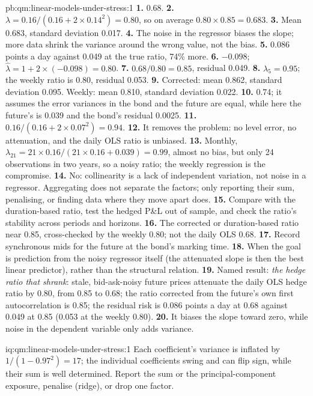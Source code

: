 \begin{solution}{pb:qm:linear-models-under-stress:1}
\textbf{1.} 0.68.
\textbf{2.} $\lambda = 0.16/(0.16 + 2 \times 0.14^2) = 0.80$, so on average $0.80 \times 0.85 = 0.683$.
\textbf{3.} Mean 0.683, standard deviation 0.017.
\textbf{4.} The noise in the regressor biases the slope; more data shrink the variance around the wrong value, not the bias.
\textbf{5.} 0.086 points a day against 0.049 at the true ratio, 74\% more.
\textbf{6.} $-0.098$; $\hat\lambda = 1 + 2 \times (-0.098) = 0.80$.
\textbf{7.} $0.68/0.80 = 0.85$, residual 0.049.
\textbf{8.} $\lambda_5 = 0.95$; the weekly ratio is 0.80, residual 0.053.
\textbf{9.} Corrected: mean 0.862, standard deviation 0.095. Weekly: mean 0.810, standard deviation 0.022.
\textbf{10.} 0.74; it assumes the error variances in the bond and the future are equal, while here the future's is 0.039 and the bond's residual
0.0025.
\textbf{11.} $0.16/(0.16 + 2 \times 0.07^2) = 0.94$.
\textbf{12.} It removes the problem: no level error, no attenuation, and the daily OLS ratio is unbiased.
\textbf{13.} Monthly, $\lambda_{21} = 21 \times 0.16/(21 \times 0.16 + 0.039) = 0.99$, almost no bias, but only 24 observations in two years, so a noisy
ratio; the weekly regression is the compromise.
\textbf{14.} No: collinearity is a lack of independent variation, not noise in a regressor. Aggregating does not separate the factors; only reporting
their sum, penalising, or finding data where they move apart does.
\textbf{15.} Compare with the duration-based ratio, test the hedged P\&L out of sample, and check the ratio's stability across periods and
horizons.
\textbf{16.} The corrected or duration-based ratio near 0.85, cross-checked by the weekly 0.80; not the daily OLS 0.68.
\textbf{17.} Record synchronous mids for the future at the bond's marking time.
\textbf{18.} When the goal is prediction from the noisy regressor itself (the attenuated slope is then the best linear predictor), rather than the
structural relation.
\textbf{19.} Named result: \emph{the hedge ratio that shrank}: stale, bid-ask-noisy future prices attenuate the daily OLS hedge ratio by 0.80, from
0.85 to 0.68; the ratio corrected from the future's own first autocorrelation is 0.85; the residual risk is 0.086 points a day at 0.68 against 0.049
at 0.85 (0.053 at the weekly 0.80).
\textbf{20.} It biases the slope toward zero, while noise in the dependent variable only adds variance.
\end{solution}

\begin{solution}{iq:qm:linear-models-under-stress:1}
Each coefficient's variance is inflated by $1/(1 - 0.97^2) = 17$; the individual coefficients swing and can flip sign, while their sum is well
determined. Report the sum or the principal-component exposure, penalise (ridge), or drop one factor.
\end{solution}

